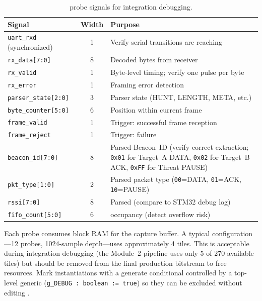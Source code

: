 \documentclass[11pt,letterpaper]{article}
\begin{document}
	\begin{table}[ht!]
		\centering
		\caption{\ILA{} probe signals for integration debugging.}
		\label{tab:ila}
		\renewcommand{\arraystretch}{1.3}
		\begin{tabularx}{\textwidth}{l c X}
			\toprule
			\textbf{Signal} & \textbf{Width} & \textbf{Purpose} \\
			\midrule
			\texttt{uart\_rxd} (synchronized) & 1 & Verify serial transitions are reaching \FPGA{} \\
			\texttt{rx\_data[7:0]} & 8 & Decoded bytes from \UART{} receiver \\
			\texttt{rx\_valid} & 1 & Byte-level timing; verify one pulse per byte \\
			\texttt{rx\_error} & 1 & Framing error detection \\
			\texttt{parser\_state[2:0]} & 3 & Parser \FSM{} state (HUNT, LENGTH, META, etc.) \\
			\texttt{byte\_counter[5:0]} & 6 & Position within current frame \\
			\texttt{frame\_valid} & 1 & Trigger: successful frame reception \\
			\texttt{frame\_reject} & 1 & Trigger: \CRC{} failure \\
			\texttt{beacon\_id[7:0]} & 8 & Parsed Beacon~ID (verify correct extraction; \texttt{0x01} for Target~A DATA, \texttt{0x02} for Target~B ACK, \texttt{0xFF} for Threat PAUSE) \\
			\texttt{pkt\_type[1:0]} & 2 & Parsed packet type (\texttt{00}=DATA, \texttt{01}=ACK, \texttt{10}=PAUSE) \\
			\texttt{rssi[7:0]} & 8 & Parsed \RSSI{} (compare to STM32 debug log) \\
			\texttt{fifo\_count[5:0]} & 6 & \FIFO{} occupancy (detect overflow risk) \\
			\bottomrule
		\end{tabularx}
	\end{table}

	\begin{tcolorbox}[warning={\ILA{} Resource Cost}]
		Each \ILA{} probe consumes block RAM for the capture buffer. A typical configuration---12 probes, 1024-sample depth---uses approximately 4 \BRAM{} tiles. This is acceptable during integration debugging (the Module~2 pipeline uses only 5 of 270 available \BRAM{} tiles) but should be removed from the final production bitstream to free resources. Mark \ILA{} instantiations with a generate conditional controlled by a top-level generic (\texttt{g\_DEBUG : boolean := true}) so they can be excluded without editing \RTL{}.
	\end{tcolorbox}
\end{document}
